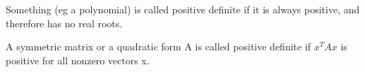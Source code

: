 Something (eg a polynomial) is called positive definite if it is always 
positive, and therefore has no real roots.
\par
A symmetric matrix or a quadratic form A is called positive definite if $x^{T}Ax$  is positive for all nonzero vectors x.